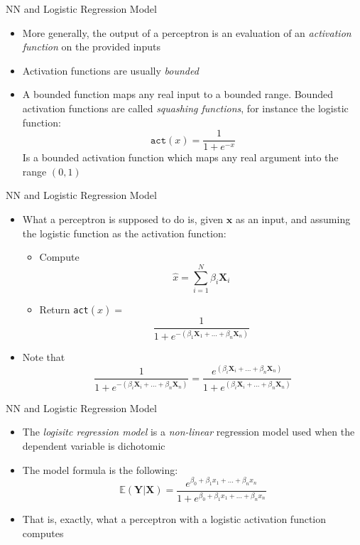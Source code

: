 \documentclass[xcolor ={table,usenames,dvipsnames}]{beamer}
\theoremstyle{definition}
\begin{document}
\begin{frame}{NN and Logistic Regression Model}
\begin{itemize}
	\item More generally, the output of a perceptron is an evaluation of an \emph{activation function} on the provided inputs
	\item Activation functions are usually \emph{bounded}
	\item A bounded function maps any real input to a bounded range. Bounded activation functions are called \emph{squashing functions}, for instance the logistic function:
	$$
	\texttt{act}(x) = \dfrac{1}{1+e^{-x}}
	$$
	Is a bounded activation function which maps any real argument into the range $(0,1)$
\end{itemize}
\end{frame}
\begin{frame}{NN and Logistic Regression Model}
\begin{itemize}
	\item What a perceptron is supposed to do is, given $\textbf{x}$ as an input, and assuming the logistic function as the activation function:
	\begin{itemize}
		\item Compute $$\hat x = \sum_{i=1}^N \beta_i \textbf{X}_i$$
		\item Return \texttt{act}$(\hat x) =$ $$ \dfrac{1}{1+e^{-(\beta_1\textbf{X}_1+ \dots + \beta_n\textbf{X}_n)}}$$
	\end{itemize}
\item Note that 
$$
\dfrac{1}{1+e^{-(\beta_i\textbf{X}_i+ \dots + \beta_n\textbf{X}_n)}} =\dfrac{e^{(\beta_i\textbf{X}_i+ \dots + \beta_n\textbf{X}_n)}}{1+e^{(\beta_i\textbf{X}_i+ \dots + \beta_n\textbf{X}_n)}}
$$
\end{itemize}
\end{frame}
\begin{frame}{NN and Logistic Regression Model}
\begin{itemize}
	\item The \emph{logisitc regression model} is a \emph{non-linear} regression model used when the dependent variable is dichotomic
	\item The model formula is the following:
	$$
	\mathbb{E}(\textbf{Y}|\textbf{X}) = \dfrac{e^{\beta_0 + \beta_1x_1+\dots+\beta_n x_n}}{1 +e^{\beta_0 + \beta_1x_1+\dots+\beta_n x_n} }
	$$
	\item That is, exactly, what a perceptron with a logistic activation function computes
\end{itemize}
\end{frame}
\end{document}
